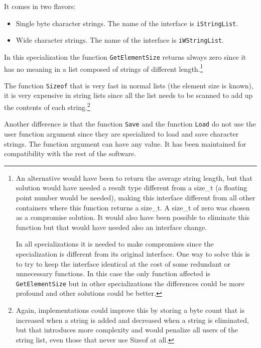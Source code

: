 \documentclass[12pt,a4paper]{memoir} %
\begin{document}
{It comes in two flavors:
\begin{itemize}
\item Single byte character strings. The name of the interface is \texttt{iStringList}.
\item Wide character strings. The name of the interface is \texttt{iWStringList}.
\end{itemize}
In this specialization the function \texttt{GetElementSize} returns always zero since it has no meaning in a list composed of strings of different
length.\footnote{An alternative would have been to return the average string length, but that solution would have needed a result type different from a 
size\_t (a floating point number would be needed), making this interface different from all other containers where this function returns a
size\_t. A size\_t of zero was chosen as a compromise solution. It would also have been possible to eliminate this function but that would have needed 
also an interface change.\par In all specializations it is needed to make compromises since the specialization is different from its original 
interface. One 
way to solve this is to try to keep the interface identical at the cost of some redundant or unnecessary functions. In this case the only function 
affected is \texttt{GetElementSize} but in other specializations the differences could be more profound and other solutions could be better.}

The function \texttt{Sizeof} that is very fast in normal lists (the element size is known), it is very expensive in string lists since all
the list needs to be scanned to add up the contents of each string.\footnote{Again, implementations could improve this by storing a byte count that
is increased when a string is added and decreased when a string is eliminated, but that introduces more complexity and would penalize all users
of the string list, even those that never use Sizeof at all.}

Another difference is that the function \texttt{Save} and the function \texttt{Load} do not use the user function argument since they are specialized
to load and save character strings. The function argument can have any value. It has been maintained for compatibility with the rest of the software.


\newpage
}
\end{document}
